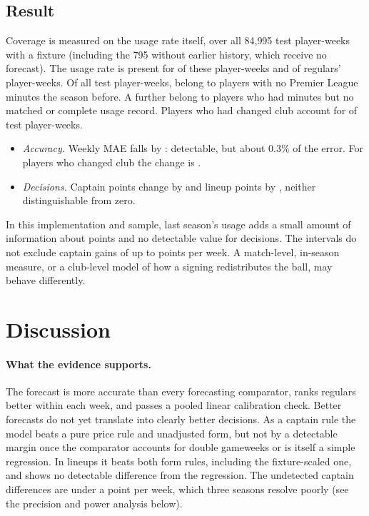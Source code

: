 \documentclass[11pt,a4paper]{article}
\begin{document}
\begin{table}[ht]
\centering
\small
\caption{Walk-forward evaluation with and without the usage features (2023/24--2025/26), paired by
gameweek with 95\% bootstrap intervals. $^a$Mean over weeks of the reduction in weekly MAE
(positive means the usage features help); the MAE columns are pooled over player-weeks.}
\label{tab:usage}

\end{table}

\subsection{Result}
Coverage is measured on the usage rate itself, over all 84{,}995 test player-weeks with a fixture
(including the 795 without earlier history, which receive no forecast). The usage rate is present
for \usageCover{} of these player-weeks and \usageCoverRegulars{} of regulars' player-weeks. Of all test player-weeks, \usageMissNoPL{} belong to players with no
Premier League minutes the season before. A further \usageMissOther{} belong to players who had
minutes but no matched or complete usage record. Players who had changed club account for
\usageMovers{} of test player-weeks.
\begin{itemize}
  \item \emph{Accuracy.} Weekly MAE falls by \usageMaeGain{}: detectable, but about 0.3\% of the
        error. For players who changed club the change is \usageMoverGain{}.
  \item \emph{Decisions.} Captain points change by \usageCapGain{} and lineup points by
        \usageLineGain{}, neither distinguishable from zero.
\end{itemize}
In this implementation and sample, last season's usage adds a small amount of information about
points and no detectable value for decisions. The intervals do not exclude captain gains of up to
\usageCapHigh{} points per week. A match-level, in-season measure, or a club-level model of how a
signing redistributes the ball, may behave differently.

\section{Discussion}\label{sec:discussion}

\paragraph{What the evidence supports.} The forecast is more accurate than every forecasting
comparator, ranks regulars better within each week, and passes a pooled linear calibration
check. Better forecasts do
not yet translate into clearly better decisions. As a captain rule the model beats a pure price
rule and unadjusted form, but not by a detectable margin once the comparator accounts for double
gameweeks or is itself a simple regression. In lineups it beats both form rules, including the
fixture-scaled one, and shows no detectable difference from the regression. The undetected
captain differences are under a point per week, which three seasons resolve poorly (see the
precision and power analysis below).
\end{document}

